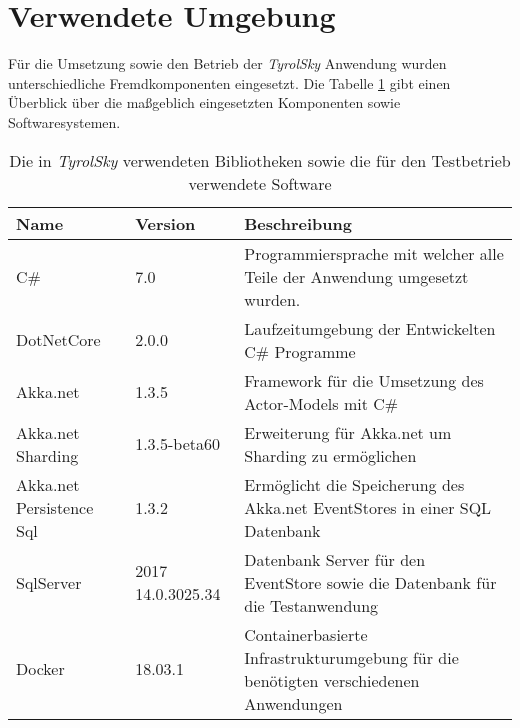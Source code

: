 \section{Verwendete Umgebung}
Für die Umsetzung sowie den Betrieb der \textit{TyrolSky} Anwendung wurden unterschiedliche Fremdkomponenten eingesetzt. Die Tabelle \ref{tab:implementation:EnvironmentVersions} gibt einen Überblick über die maßgeblich eingesetzten Komponenten sowie Softwaresystemen. 

\begin{table}[h]
  \centering
  \begin{tabular}{llp{6.5cm}}
  Name      & Version    & Beschreibung \\ \hline
  C\#     & 7.0        & Programmiersprache mit welcher alle Teile der Anwendung umgesetzt wurden. \\
  DotNetCore   & 2.0.0       & Laufzeitumgebung der Entwickelten C\# Programme \\
  Akka.net    & 1.3.5       & Framework für die Umsetzung des  Actor-Models mit C\# \\
  Akka.net Sharding & 1.3.5-beta60  & Erweiterung für Akka.net um Sharding zu ermöglichen \\
  Akka.net Persistence Sql & 1.3.2  & Ermöglicht die Speicherung des Akka.net EventStores in einer SQL Datenbank\\
  SqlServer    & 2017 14.0.3025.34 & Datenbank Server für den EventStore sowie die Datenbank für die Testanwendung\\
  Docker     & 18.03.1      & Containerbasierte Infrastrukturumgebung für die benötigten verschiedenen Anwendungen\\
    \end{tabular}
    \caption{Die in \textit{TyrolSky} verwendeten Bibliotheken sowie die für den Testbetrieb verwendete Software}
    \label{tab:implementation:EnvironmentVersions}
    \end{table}